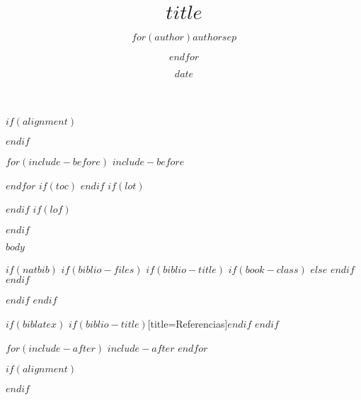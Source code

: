 \documentclass[letterpaper, 12pt, spanish, twoside]{book}
\title{$title$}
\author{$for(author)$$author$$sep$ \and $endfor$}
\date{$date$}
\begin{document}
  $if(alignment)$
  \begin{$alignment$}
  $endif$

  $for(include-before)$
  $include-before$

  $endfor$
  $if(toc)$
  {
  \hypersetup{linkcolor=black}
  \setcounter{tocdepth}{$toc-depth$}
  \tableofcontents
  }
  $endif$
  $if(lot)$
  \listoftables
  $endif$
  $if(lof)$
  \listoffigures
  $endif$

  $body$

  $if(natbib)$
  $if(biblio-files)$
  $if(biblio-title)$
  $if(book-class)$
  \renewcommand\bibname{Bibliography}
  $else$
  \renewcommand\refname{References}
  $endif$
  $endif$
  
  $endif$
  $endif$

  $if(biblatex)$
  \printbibliography$if(biblio-title)$[title=Referencias]$endif$
  $endif$

  $for(include-after)$
  $include-after$
  $endfor$

  $if(alignment)$
  \end{$alignment$}
  $endif$
\end{document}
